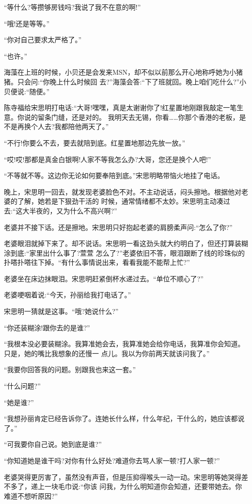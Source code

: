 \documentclass[11pt,a4paper,onecolumn]{article}
\begin{document}
``等什么?等攒够房钱吗?我说了我不在意的啊!''

``哦!还是等等。''

``你对自己要求太严格了。''

``也许。''

海藻在上班的时候，小贝还是会发来MSN，却不似以前那么开心地称呼她为小猪猪。只会问:``你晚上什么时候回
去?''海藻会答:``下了班就回。晚上咱们吃什么?''小贝便说:``随便。''

陈寺福给宋思明打电话:``大哥!嘿嘿，真是太谢谢你了!红星置地刚跟我敲定一笔生意。你说的留条门缝，还是对的。
我明天去无锡，你看……你那个香港的老板，是不是再换个人去?我都陪他两天了。''

``不行!你要么不去，要去就陪到底。红星置地那边先放一放。''

``哎!哎!那都是真金白银啊!人家不等我怎么办?大哥，您还是换个人吧!''

``不等就不等。这边你无论如何要奉陪到底。''宋思明略带恼火地挂了电话。

晚上，宋思明一回去，就发现老婆脸色不对。不主动说话，闷头擦地。根据他对老婆的了解，她若是下狠劲干活的
时候，通常情绪都不太妙。宋思明主动凑过去:``这大半夜的，又为什么不高兴啊?''

老婆并不接下话。还是擦地。宋思明只好抱起老婆的肩膀柔声问:``怎么了你?''

老婆眼泪就掉下来了。却不说话。宋思明一看这劲头就大约明白了，但还打算装糊涂到底:``家里出什么事了?萱萱
怎么了?''老婆依旧不答，眼泪跟断了线的珍珠似的扑嗒扑嗒往下掉。``有什么事情说出来，看看我能不能帮上忙?''

老婆坐在床边抹眼泪。宋思明赶紧倒杯水递过去。``单位不顺心了?''

老婆哽咽着说:``今天，孙丽给我打电话了。''

宋思明一猜就是这事。``哦?她说什么?''

``你还装糊涂!跟你去的是谁?''

``我根本没必要装糊涂。我算准她会去，我算准她会给你电话，我算准你会知道。只是，她的嘴比我想象的还慢一
点儿。我以为你前两天就该问我了。''

``我要你回答我的问题。别跟我也来这一套。''

``什么问题?''

``她是谁?''

``我想孙丽肯定已经告诉你了。连她长什么样，什么年纪，干什么的，她应该都说了。''

``可我要你自己说。她到底是谁?''

``你知道她是谁干吗?对你有什么好处?难道你去骂人家一顿?打人家一顿?''

老婆哭得更厉害了，虽然没有声音，但是压抑得喉头一动一动。宋思明等她哭得差不多了，递上一块毛巾说:``你该
问我，为什么明知道你会知道，还要带她去。你难道不想听原因?''
\end{document}
